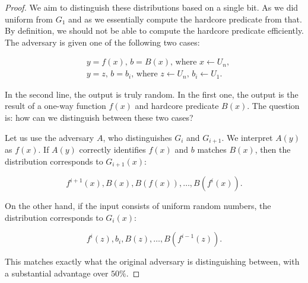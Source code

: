 \begin{proof}
	We aim to distinguish these distributions based on a single bit. As we did uniform from $G_1$ and as we essentially compute the hardcore predicate from that. By definition, we should not be able to compute the hardcore predicate efficiently. The adversary is given one of the following two cases:
	
	\begin{align*}
	    \quad y = f(x), \, b = B(x), \, \text{where } x \leftarrow U_n, \\
	    \quad y = z, \, b = b_i, \, \text{where } z \leftarrow U_n, \, b_i \leftarrow U_1.
	\end{align*}
	
	In the second line, the output is truly random. In the first one, the output is the result of a one-way function \( f(x) \) and hardcore predicate \( B(x) \). The question is: how can we distinguish between these two cases?
	
	Let us use the adversary \( A \), who distinguishes \( G_i \) and \( G_{i+1} \). We interpret \( A(y) \) as \( f(x) \). If \( A(y) \) correctly identifies \( f(x) \) and \( b \) matches \( B(x) \), then the distribution corresponds to \( G_{i+1}(x) \):
	
	\[
	f^{i+1}(x), B(x), B(f(x)), \dots, B(f^i(x)).
	\]
	
	On the other hand, if the input consists of uniform random numbers, the distribution corresponds to \( G_i(x) \):
	
	\[
	f^i(z), b_i, B(z), \dots, B(f^{i-1}(z)).
	\]
	
	This matches exactly what the original adversary is distinguishing between, with a substantial advantage over \( 50\% \).
\end{proof}
